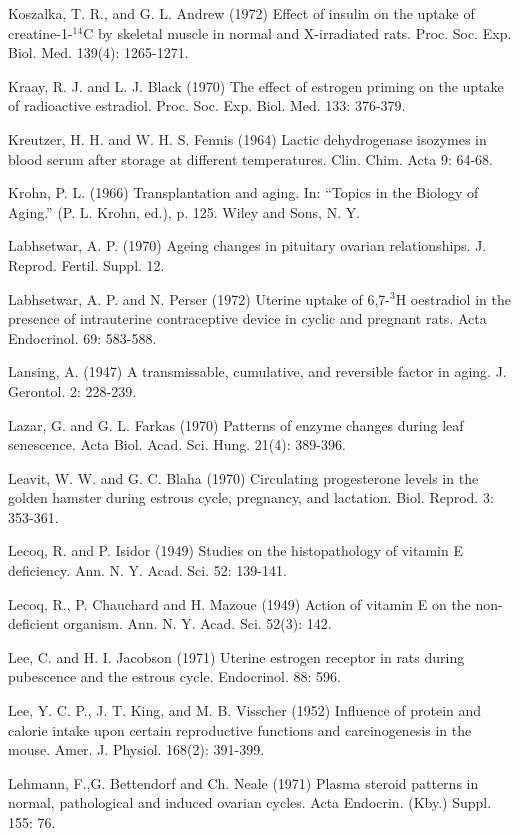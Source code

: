 Koszalka, T. R., and G. L. Andrew (1972) Effect of insulin on the uptake of creatine-1-$^{14}$C by skeletal muscle in normal and X-irradiated rats. Proc. Soc. Exp. Biol. Med. 139(4): 1265-1271.


Kraay, R. J. and L. J. Black (1970) The effect of estrogen priming on the uptake of radioactive estradiol. Proc. Soc. Exp. Biol. Med. 133: 376-379.

Kreutzer, H. H. and W. H. S. Fennis (1964) Lactic dehydrogenase isozymes in blood serum after storage at different temperatures. Clin. Chim. Acta 9: 64-68.

Krohn, P. L. (1966) Transplantation and aging. In: ``Topics in the Biology of Aging.'' (P. L. Krohn, ed.), p. 125. Wiley and Sons, N. Y.

Labhsetwar, A. P. (1970) Ageing changes in pituitary ovarian relationships. J. Reprod. Fertil. Suppl. 12.

Labhsetwar, A. P. and N. Perser (1972) Uterine uptake of 6,7-$^3$H oestradiol in the presence of intrauterine contraceptive device in cyclic and pregnant rats. Acta Endocrinol. 69: 583-588.

Lansing, A. (1947) A transmissable, cumulative, and reversible factor in aging. J. Gerontol. 2: 228-239.

Lazar, G. and G. L. Farkas (1970) Patterns of enzyme changes during leaf senescence. Acta Biol. Acad. Sci. Hung. 21(4): 389-396.

Leavit, W. W. and G. C. Blaha (1970) Circulating progesterone levels in the golden hamster during estrous cycle, pregnancy, and lactation. Biol. Reprod. 3: 353-361.

Lecoq, R. and P. Isidor (1949) Studies on the histopathology of vitamin E deficiency. Ann. N. Y. Acad. Sci. 52: 139-141.

Lecoq, R., P. Chauchard and H. Mazoue (1949) Action of vitamin E on the non-deficient organism. Ann. N. Y. Acad. Sci. 52(3): 142.

Lee, C. and H. I. Jacobson (1971) Uterine estrogen receptor in rats during pubescence and the estrous cycle. Endocrinol. 88: 596.

Lee, Y. C. P., J. T. King, and M. B. Visscher (1952) Influence of protein and calorie intake upon certain reproductive functions and carcinogenesis in the mouse. Amer. J. Physiol. 168(2): 391-399.

Lehmann, F.,G. Bettendorf and Ch. Neale (1971) Plasma steroid patterns in normal, pathological and induced ovarian cycles. Acta Endocrin. (Kby.) Suppl. 155: 76.

